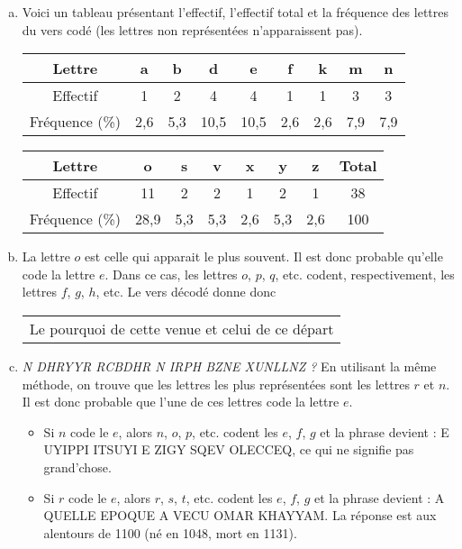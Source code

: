 \documentclass[11pt]{article}
\begin{document}
\begin{exercice}[Statistiques]
\begin{enumerate}[(1)]
        \begin{enumerate}[(a)]
          \item Voici un tableau présentant l'effectif, l'effectif total et la fréquence des lettres du vers codé (les lettres non représentées n'apparaissent pas).

            \hspace{-0.6cm}\begin{tabular}{c|cccccccc}
          Lettre     & a & b & d & e & f & k & m & n \\
              \hline
          Effectif   & 1 & 2 & 4 & 4 & 1 & 1 & 3 & 3 \\
          Fréquence (\%) & 2,6 & 5,3 & 10,5 & 10,5 & 2,6 & 2,6 & 7,9 & 7,9 \\
        \end{tabular}

        \hspace{-0.6cm}\begin{tabular}{c|cccccc|c}
          Lettre     & o & s & v & x & y & z & Total\\
          \hline
          Effectif   & 11&2 & 2 & 1 & 2 & 1 &  38  \\
          Fréquence (\%) & 28,9&5,3 & 5,3 & 2,6 & 5,3 & 2,6 & 100
        \end{tabular}

          \item La lettre $o$ est celle qui apparait le plus souvent. Il est
            donc probable qu'elle code la lettre $e$. Dans ce cas, les
            lettres $o$, $p$, $q$, etc. codent, respectivement, les lettres
            $f$, $g$, $h$, etc. Le vers décodé donne donc 

        \begin{tabular}{|l}
          Le pourquoi de cette venue et celui de ce départ
        \end{tabular}
      \item \emph{N DHRYYR RCBDHR N IRPH BZNE XUNLLNZ ?}
        En utilisant la même méthode, on trouve que les lettres les plus représentées sont les lettres $r$ et $n$. Il est donc probable que l'une de ces lettres code la lettre $e$.

        \begin{itemize}
          \item Si $n$ code le $e$, alors $n$, $o$, $p$, etc. codent les $e$, $f$, $g$ et la phrase devient : \og{}E UYIPPI ITSUYI E ZIGY SQEV OLECCEQ\fg, ce qui ne signifie pas grand'chose.
          \item Si $r$ code le $e$, alors $r$, $s$, $t$, etc. codent les $e$, $f$, $g$ et la phrase devient : \og{}A QUELLE EPOQUE A VECU OMAR KHAYYAM\fg. La réponse est aux alentours de 1100 (né en 1048, mort en 1131).
        \end{itemize}
        \end{enumerate}


    \end{enumerate}
  \end{exercice}
\end{document}
